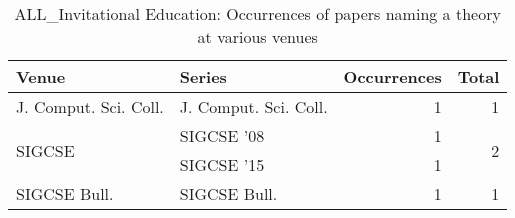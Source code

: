 \begin{table*}[t]
\begin{tabular}{llrr}
Venue & Series & Occurrences & Total\\\hline
\multirow{1}{*}{J. Comput. Sci. Coll.} & J. Comput. Sci. Coll. & 1 & \multirow{1}{*}{1}\\
\multirow{2}{*}{SIGCSE } & SIGCSE '08 & 1 & \multirow{2}{*}{2}\\
& SIGCSE '15 & 1 &\\
\multirow{1}{*}{SIGCSE Bull.} & SIGCSE Bull. & 1 & \multirow{1}{*}{1}\\
\end{tabular}
\caption{ALL\_Invitational Education: Occurrences of papers naming a theory at various venues}
\end{table*}